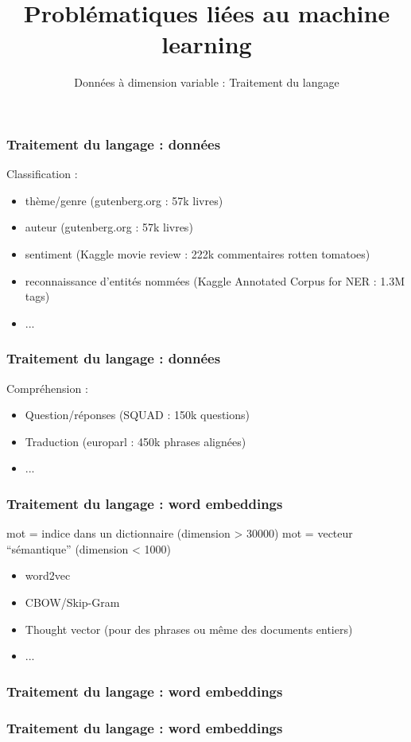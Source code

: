 \documentclass{formation}
\title{Problématiques liées au machine learning}
\subtitle{Données à dimension variable : Traitement du langage}
\begin{document}
\maketitle

\begin{frame}
  \frametitle{Traitement du langage : données}
  Classification :
  \begin{itemize}
  \item thème/genre (gutenberg.org : 57k livres)
  \item auteur (gutenberg.org : 57k livres)
  \item sentiment (Kaggle movie review : 222k commentaires rotten tomatoes)
  \item reconnaissance d'entités nommées (Kaggle Annotated Corpus for NER : 1.3M tags)
  \item ...
  \end{itemize}
\end{frame}

\begin{frame}
  \frametitle{Traitement du langage : données}
  Compréhension :
  \begin{itemize}
  \item Question/réponses (SQUAD : 150k questions)
  \item Traduction (europarl : 450k phrases alignées)
  \item ...
  \end{itemize}
\end{frame}

\begin{frame}
  \frametitle{Traitement du langage : word embeddings} 
  mot = indice dans un dictionnaire (dimension > 30000)
  \newline
  mot = vecteur ``sémantique'' (dimension < 1000) 
  \begin{itemize}
  \item word2vec
  \item CBOW/Skip-Gram
  \item Thought vector (pour des phrases ou même des documents entiers)
  \item ...
  \end{itemize}
\end{frame}

\begin{frame}
  \frametitle{Traitement du langage : word embeddings} 
\end{frame}

\begin{frame}
  \frametitle{Traitement du langage : word embeddings} 
  \begin{center}
    \href{https://ml5js.org/docs/word2vec-example}{} \\
    \href{https://projector.tensorflow.org/}{}
  \end{center}
\end{frame}
\end{document}

